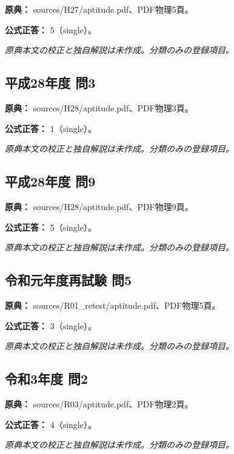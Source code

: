 \noindent\textbf{原典：} sources/H27/aptitude.pdf、PDF物理5頁。

\textbf{公式正答：} 5（single）。

\par\textit{原典本文の校正と独自解説は未作成。分類のみの登録項目。}

\subsection{平成28年度 問3}
\label{q:h28-reg-apt-03}

\noindent\textbf{原典：} sources/H28/aptitude.pdf、PDF物理3頁。

\textbf{公式正答：} 1（single）。

\par\textit{原典本文の校正と独自解説は未作成。分類のみの登録項目。}

\subsection{平成28年度 問9}
\label{q:h28-reg-apt-09}

\noindent\textbf{原典：} sources/H28/aptitude.pdf、PDF物理9頁。

\textbf{公式正答：} 5（single）。

\par\textit{原典本文の校正と独自解説は未作成。分類のみの登録項目。}

\subsection{令和元年度再試験 問5}
\label{q:r01-ret-apt-05}

\noindent\textbf{原典：} sources/R01\_retest/aptitude.pdf、PDF物理5頁。

\textbf{公式正答：} 3（single）。

\par\textit{原典本文の校正と独自解説は未作成。分類のみの登録項目。}

\subsection{令和3年度 問2}
\label{q:r03-reg-apt-02}

\noindent\textbf{原典：} sources/R03/aptitude.pdf、PDF物理2頁。

\textbf{公式正答：} 4（single）。

\par\textit{原典本文の校正と独自解説は未作成。分類のみの登録項目。}

